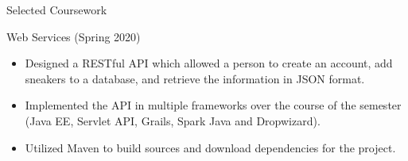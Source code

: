 \documentclass[]{johnsoncv}
\begin{document}
	\begin{cvsection}{Selected Coursework}
		

		\begin{cvsubsection}{Web Services (Spring 2020)}{}{}
			\begin{itemize}
				\item Designed a RESTful API which allowed a person to create an account, add sneakers to a database, and retrieve the information in JSON format.
				\item Implemented the API in multiple frameworks over the course of the semester (Java EE, Servlet API, Grails, Spark Java and Dropwizard).
				\item Utilized Maven to build sources and download dependencies for the project.
			\end{itemize}
		\end{cvsubsection}	

	


\end{cvsection}
\end{document}

